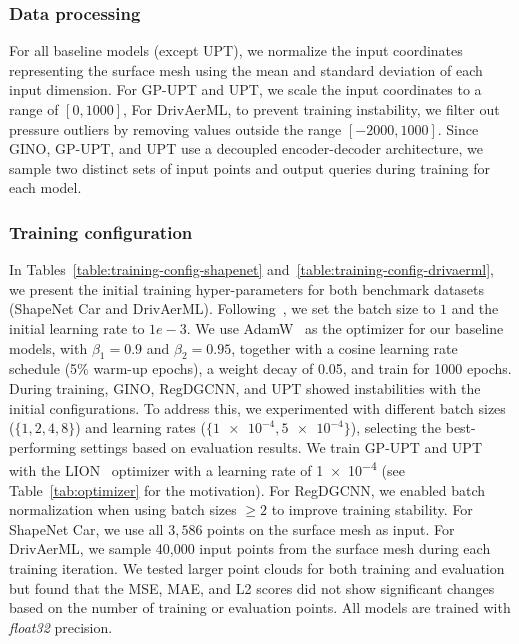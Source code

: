 \subsubsection{Data processing}

For all baseline models (except \ac{UPT}), we normalize the input coordinates representing the surface mesh using the mean and standard deviation of each input dimension. 
For \ac{GP-UPT} and \ac{UPT}, we scale the input coordinates to a range of $[0, 1000]$,
For DrivAerML, to prevent training instability, we filter out pressure outliers by removing values outside the range $[-2000, 1000]$.
Since \ac{GINO}, \ac{GP-UPT}, and \ac{UPT} use a decoupled encoder-decoder architecture, we sample two distinct sets of input points and output queries during training for each model.

\subsubsection{Training configuration}
In Tables~\ref{table:training-config-shapenet} and~\ref{table:training-config-drivaerml}, we present the initial training hyper-parameters for both benchmark datasets (ShapeNet Car and DrivAerML). 
Following~\cite{wu2024transolver}, we set the batch size to $1$ and the initial learning rate to $1e-3$. 
We use AdamW~\cite{loshchilov2017fixing} as the optimizer for our baseline models, with $\beta_1 = 0.9$ and $\beta_2 = 0.95$, together with a cosine learning rate schedule (5\% warm-up epochs), a weight decay of 0.05, and train for 1000 epochs.
During training, \ac{GINO}, RegDGCNN, and \ac{UPT} showed instabilities with the initial configurations. 
To address this, we experimented with different batch sizes ($\{1, 2, 4, 8\}$) and learning rates ($\{\num{1e-4}, \num{5e-4}\}$), selecting the best-performing settings based on evaluation results. 
We train \ac{GP-UPT} and \ac{UPT} with the LION~\cite{chen2023symbolic} optimizer with a learning rate of \num{1e-4} (see Table~\ref{tab:optimizer} for the motivation).
For RegDGCNN, we enabled batch normalization when using batch sizes $\geq 2$ to improve training stability.
For ShapeNet Car, we use all $3,586$ points on the surface mesh as input. For DrivAerML, we sample 40,000 input points from the surface mesh during each training iteration. 
We tested larger point clouds for both training and evaluation but found that the MSE, MAE, and L2 scores did not show significant changes based on the number of training or evaluation points.
All models are trained with \emph{float32} precision.

